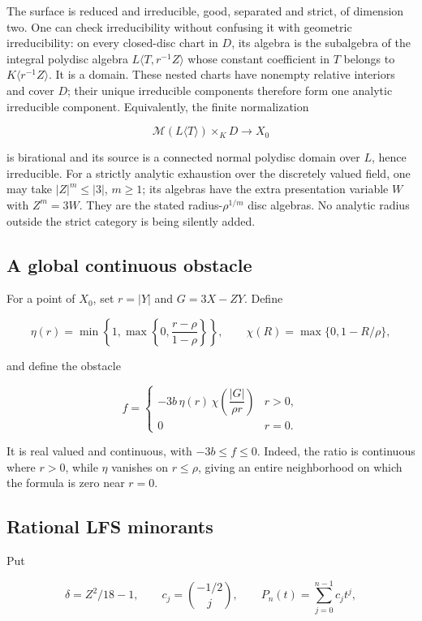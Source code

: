 \documentclass[11pt,a4paper]{article}
\begin{document}
The surface is reduced and irreducible, good, separated and strict, of dimension two. One can check irreducibility without confusing it with geometric irreducibility: on every closed-disc chart in \(D\), its algebra is the subalgebra of the integral polydisc algebra \(L\langle T,r^{-1}Z\rangle\) whose constant coefficient in \(T\) belongs to \(K\langle r^{-1}Z\rangle\). It is a domain. These nested charts have nonempty relative interiors and cover \(D\); their unique irreducible components therefore form one analytic irreducible component. Equivalently, the finite normalization

\[
\mathcal M(L\langle T\rangle)\times_K D\longrightarrow X_0
\]

is birational and its source is a connected normal polydisc domain over \(L\), hence irreducible. For a strictly analytic exhaustion over the discretely valued field, one may take \(|Z|^m\leq|3|\), \(m\geq1\); its algebras have the extra presentation variable \(W\) with \(Z^m=3W\). They are the stated radius-\(\rho^{1/m}\) disc algebras. No analytic radius outside the strict category is being silently added.

\subsection*{A global continuous obstacle}

For a point of \(X_0\), set \(r=|Y|\) and \(G=3X-ZY\). Define

\[
\eta(r)=\min\left\{1,\max\left\{0,\frac{r-\rho}{1-\rho}\right\}\right\},
\qquad \chi(R)=\max\{0,1-R/\rho\},
\]

and define the obstacle

\[
f=
\begin{cases}
-3b\,\eta(r)\,\chi\left(\dfrac{|G|}{\rho r}\right)&r>0,\\
0&r=0.
\end{cases} \tag{6.1}
\]

It is real valued and continuous, with \(-3b\leq f\leq0\). Indeed, the ratio is continuous where \(r>0\), while \(\eta\) vanishes on \(r\leq\rho\), giving an entire neighborhood on which the formula is zero near \(r=0\).

\subsection*{Rational LFS minorants}

Put

\[
\delta=Z^2/18-1,\qquad
c_j=\binom{-1/2}{j},\qquad
P_n(t)=\sum_{j=0}^{n-1}c_jt^j,
\]
\end{document}
